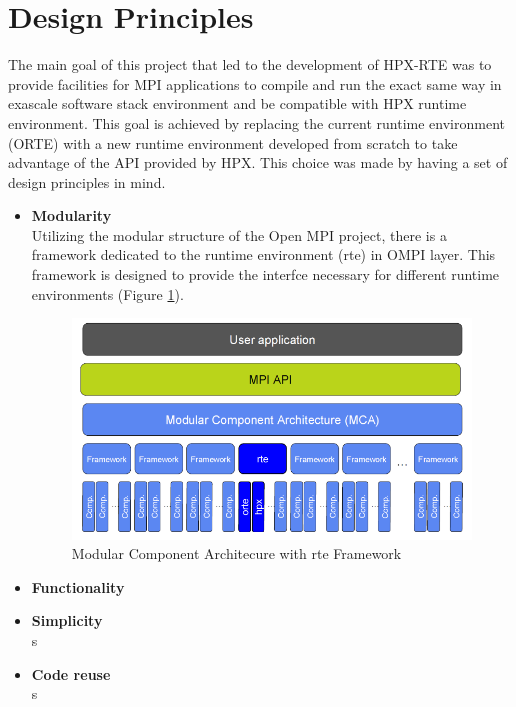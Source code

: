 \section{Design Principles}
\label{sec:design}
The main goal of this project that led to the development of HPX-RTE was to provide facilities for MPI applications to compile and run the exact same way in exascale software stack environment and be compatible with HPX runtime environment. This goal is achieved by replacing the current runtime environment (ORTE) with a new runtime environment developed from scratch to take advantage of the API provided by HPX. This choice was made by having a set of design principles in mind.

\begin{itemize}
\item \textbf{Modularity}\\
  Utilizing the modular structure of the Open MPI project, there is a framework dedicated to the runtime environment (rte) in OMPI layer. This framework is designed to provide the interfce necessary for different runtime environments (Figure \ref{fig:MCA-hpx-rte}).

\begin{figure}[ht]
\centering
\includegraphics[scale=0.5]{images/MCA-hpx-rte.png}
\caption[Modular Component Architecure with rte Framework]{Modular Component Architecure with rte Framework}
\label{fig:MCA-hpx-rte}
\end{figure}
  
\item \textbf{Functionality}\\
  
\item \textbf{Simplicity}\\
  s
\item \textbf{Code reuse}\\
  s

\end{itemize}

